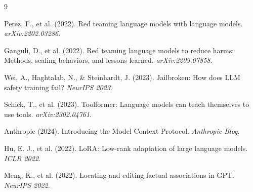 \documentclass[10pt]{article}
\begin{document}

\begin{thebibliography}{9}

Perez, F., et al. (2022). Red teaming language models with language models. \textit{arXiv:2202.03286}.

Ganguli, D., et al. (2022). Red teaming language models to reduce harms: Methods, scaling behaviors, and lessons learned. \textit{arXiv:2209.07858}.

Wei, A., Haghtalab, N., \& Steinhardt, J. (2023). Jailbroken: How does LLM safety training fail? \textit{NeurIPS 2023}.

Schick, T., et al. (2023). Toolformer: Language models can teach themselves to use tools. \textit{arXiv:2302.04761}.

Anthropic (2024). Introducing the Model Context Protocol. \textit{Anthropic Blog}.

Hu, E. J., et al. (2022). LoRA: Low-rank adaptation of large language models. \textit{ICLR 2022}.

Meng, K., et al. (2022). Locating and editing factual associations in GPT. \textit{NeurIPS 2022}.

\end{thebibliography}
\end{document}
